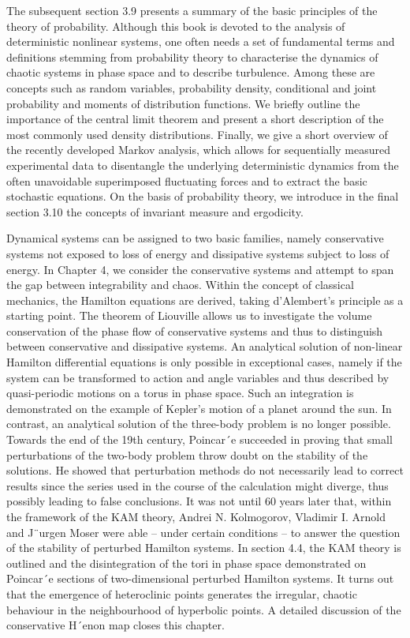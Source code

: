 \documentclass[12pt]{article}
\begin{document}
\hfill

The subsequent section 3.9 presents a summary of the basic principles of the theory
of probability. Although this book is devoted to the analysis of deterministic nonlinear
systems, one often needs a set of fundamental terms and definitions stemming
from probability theory to characterise the dynamics of chaotic systems in
phase space and to describe turbulence. Among these are concepts such as random
variables, probability density, conditional and joint probability and moments of distribution
functions. We briefly outline the importance of the central limit theorem
and present a short description of the most commonly used density distributions.
Finally, we give a short overview of the recently developed Markov analysis, which
allows for sequentially measured experimental data to disentangle the underlying
deterministic dynamics from the often unavoidable superimposed fluctuating forces
and to extract the basic stochastic equations. On the basis of probability theory, we
introduce in the final section 3.10 the concepts of invariant measure and ergodicity.

\hfill

Dynamical systems can be assigned to two basic families, namely conservative systems
not exposed to loss of energy and dissipative systems subject to loss of energy.
In Chapter 4, we consider the conservative systems and attempt to span the gap
between integrability and chaos. Within the concept of classical mechanics, the
Hamilton equations are derived, taking d’Alembert’s principle as a starting point.
The theorem of Liouville allows us to investigate the volume conservation of the
phase flow of conservative systems and thus to distinguish between conservative
and dissipative systems. An analytical solution of non-linear Hamilton differential
equations is only possible in exceptional cases, namely if the system can be transformed
to action and angle variables and thus described by quasi-periodic motions
on a torus in phase space. Such an integration is demonstrated on the example of
Kepler’s motion of a planet around the sun. In contrast, an analytical solution of
the three-body problem is no longer possible. Towards the end of the 19th century,
Poincar´e succeeded in proving that small perturbations of the two-body problem
throw doubt on the stability of the solutions. He showed that perturbation methods
do not necessarily lead to correct results since the series used in the course
of the calculation might diverge, thus possibly leading to false conclusions. It was
not until 60 years later that, within the framework of the KAM theory, Andrei
N. Kolmogorov, Vladimir I. Arnold and J¨urgen Moser were able – under certain
conditions – to answer the question of the stability of perturbed Hamilton systems.
In section 4.4, the KAM theory is outlined and the disintegration of the tori in phase
space demonstrated on Poincar´e sections of two-dimensional perturbed Hamilton
systems. It turns out that the emergence of heteroclinic points generates the irregular,
chaotic behaviour in the neighbourhood of hyperbolic points. A detailed
discussion of the conservative H´enon map closes this chapter.
\end{document}
